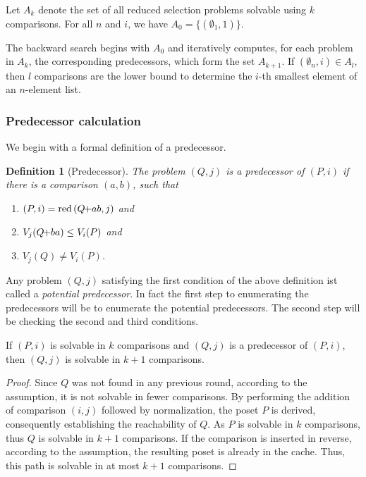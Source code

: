 \documentclass[twoside,leqno,twocolumn]{article}
\newcommand{\pchild}[3]{{#1}\kern-1pt{+}{#2}{#3}}
\newcommand{\reduced}[1]{\operatorname{red}{#1}}
\newtheorem{definition}{Definition}[section]
\begin{document}
Let $A_k$ denote the set of all reduced selection problems solvable using $k$ comparisons.
For all $n$ and $i$, we have $A_0 = \{ (\emptyset_1, 1) \}$.

The backward search begins with $A_0$ and iteratively computes, for each problem in $A_k$, the corresponding predecessors, which form the set $A_{k + 1}$.
If $(\emptyset_n, i) \in A_l$, then $l$ comparisons are the lower bound to determine the $i$-th smallest element of an $n$-element list.


\subsubsection{Predecessor calculation} \label{sec:backward:predecessor_calculation}

We begin with a formal definition of a predecessor.

\begin{definition}[Predecessor] \label{definition:predecessor_calculation}
  The problem $(Q, j)$ is a \emph{predecessor} of $(P, i)$ if there is a comparison $(a, b)$, such that
  \begin{enumerate}
    \item $(P, i) = \reduced(\pchild{Q}{a}{b}, j)$ and
    \item $V_j(\pchild{Q}{b}{a}) \le V_i(P)$ and
    \item $V_j(Q) \neq V_i(P)$.
  \end{enumerate}
\end{definition}

Any problem $(Q, j)$ satisfying the first condition of the above definition ist called a \emph{potential predecessor}.
In fact the first step to enumerating the predecessors will be to enumerate the potential predecessors.
The second step will be checking the second and third conditions.

\begin{lemma} \label{lemma:predecessor_calculation}
  If $(P, i)$ is solvable in $k$ comparisons and $(Q, j)$ is a predecessor of $(P, i)$, then $(Q, j)$ is solvable in $k + 1$ comparisons.
\end{lemma}

\begin{proof} \label{proof:predecessor_calculation}
  Since $Q$ was not found in any previous round, according to the assumption, it is not solvable in fewer comparisons.
  By performing the addition of comparison $(i, j)$ followed by normalization, the poset $P$ is derived, consequently establishing the reachability of $Q$.
  As $P$ is solvable in $k$ comparisons, thus $Q$ is solvable in $k + 1$ comparisons.
  If the comparison is inserted in reverse, according to the assumption, the resulting poset is already in the cache.
  Thus, this path is solvable in at most $k + 1$ comparisons.
\end{proof}
\end{document}

